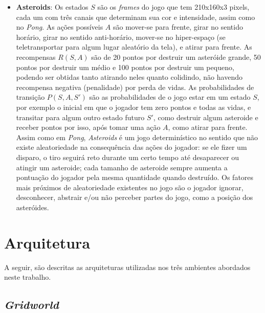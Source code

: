 \begin{itemize}
\item \textbf{Asteroids}:
Os estados $S$ são os \textit{frames} do jogo que tem 210x160x3 pixels, cada um com três canais que determinam sua cor e intensidade, assim como no \textit{Pong}.
As ações possíveis $A$ são mover-se para frente, girar no sentido horário, girar no sentido anti-horário, mover-se no hiper-espaço (se teletransportar para algum lugar aleatório da tela), e atirar para frente.
As recompensas $R(S,A)$ são de 20 pontos por destruir um asteróide grande, 50 pontos por destruir um médio e 100 pontos por destruir um pequeno, podendo ser obtidas tanto atirando neles quanto colidindo, não havendo recompensa negativa (penalidade) por perda de vidas.
As probabilidades de transição $P(S,A,S')$ são as probabilidades de o jogo estar em um estado $S$, por exemplo o inicial em que o jogador tem zero pontos e todas as vidas, e transitar para algum outro estado futuro $S'$, como destruir algum asteroide e receber pontos por isso, após tomar uma ação $A$, como atirar para frente.
Assim como em \textit{Pong}, \textit{Asteroids} é um jogo determinístico no sentido que não existe aleatoriedade na consequência das ações do jogador: se ele fizer um disparo, o tiro seguirá reto durante um certo tempo até desaparecer ou atingir um asteroide; cada tamanho de asteroide sempre aumenta a pontuação do jogador pela mesma quantidade quando destruído.
Os fatores mais próximos de aleatoriedade existentes no jogo são o jogador ignorar, desconhecer, abstrair e/ou não perceber partes do jogo, como a posição dos asteróides.
\end{itemize}


\section{Arquitetura}
\label{sec:arq}

A seguir, são descritas as arquiteturas utilizadas nos três ambientes abordados neste trabalho.

\subsection{\textit{Gridworld}}
\label{sec:arq_gw}

